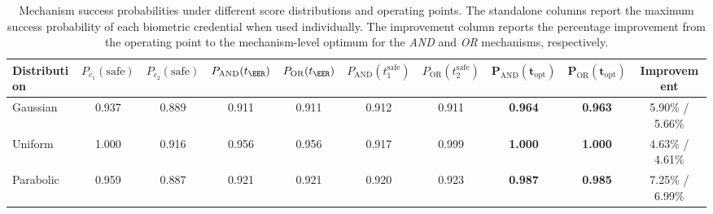 \begin{table}[t]
\centering
\setlength{\tabcolsep}{4pt}
\begin{tabular}{lccccccccc}
\toprule
Distribution & $P_{c_1}(\mathrm{safe})$ & $P_{c_2}(\mathrm{safe})$ & $P_{\mathrm{AND}}(t_{\EER})$ & $P_{\mathrm{OR}}(t_{\EER})$ & $P_{\mathrm{AND}}(t_1^{\mathrm{safe}})$ & $P_{\mathrm{OR}}(t_2^{\mathrm{safe}})$ & $\mathbf{P_{\mathrm{AND}}(t_{\mathrm{opt}})}$ & $\mathbf{P_{\mathrm{OR}}(t_{\mathrm{opt}})}$ & Improvement \\
\midrule
Gaussian & 0.937 & 0.889 & 0.911 & 0.911 & 0.912 & 0.911 & \textbf{0.964} & \textbf{0.963} & 5.90\% / 5.66\% \\
Uniform & 1.000 & 0.916 & 0.956 & 0.956 & 0.917 & 0.999 & \textbf{1.000} & \textbf{1.000} & 4.63\% / 4.61\% \\
Parabolic & 0.959 & 0.887 & 0.921 & 0.921 & 0.920 & 0.923 & \textbf{0.987} & \textbf{0.985} & 7.25\% / 6.99\% \\
\bottomrule
\end{tabular}
\caption{Mechanism success probabilities under different score distributions and operating points. The standalone columns report the maximum success probability of each biometric credential when used individually. The improvement column reports the percentage improvement from the \EER operating point to the mechanism-level optimum for the \emph{AND} and \emph{OR} mechanisms, respectively.}
\label{tab:wallet_success_dist}
\end{table}